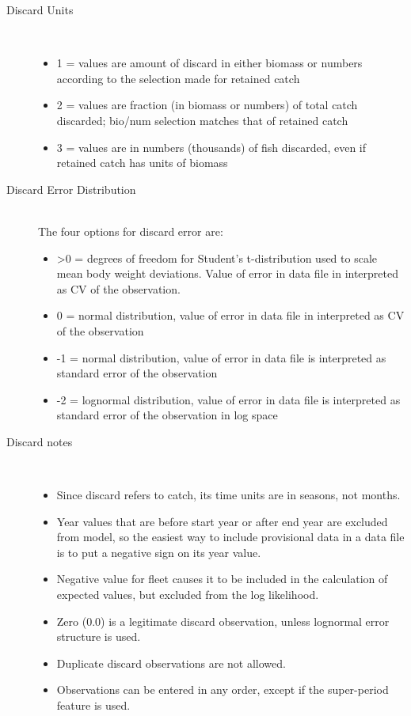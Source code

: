 \begin{description}
	\item[Discard Units]\ 
	\begin{itemize}
		\item 1 = values are amount of discard in either biomass or numbers according to the selection made for retained catch
		\item 2 = values are fraction (in biomass or numbers) of total catch discarded; bio/num selection matches that of retained catch
		\item 3 = values are in numbers (thousands) of fish discarded, even if retained catch has units of biomass
	\end{itemize}
	\item[Discard Error Distribution]\hfill\\
	The four options for discard error are:
	\begin{itemize}
		\item >0 = degrees of freedom for Student's t-distribution used to scale mean body weight deviations.  Value of error in data file in interpreted as CV of the observation.
		\item 0 = normal distribution, value of error in data file in interpreted as CV of the observation
		\item -1 = normal distribution, value of error in data file is interpreted as standard error of the observation
		\item -2 = lognormal distribution, value of error in data file is interpreted as standard error of the observation in log space 
	\end{itemize}
	\item[Discard notes]\
	\begin{itemize}
		\item Since discard refers to catch, its time units are in seasons, not months.
		\item Year values that are before start year or after end year are excluded from model, so the easiest way to include provisional data in a data file is to put a negative sign on its year value.
		\item Negative value for fleet causes it to be included in the calculation of expected values, but excluded from the log likelihood.
		\item Zero (0.0) is a legitimate discard observation, unless lognormal error structure is used.
		\item Duplicate discard observations are not allowed.
		\item Observations can be entered in any order, except if the super-period feature is used. 

\end{itemize}
\end{description}
